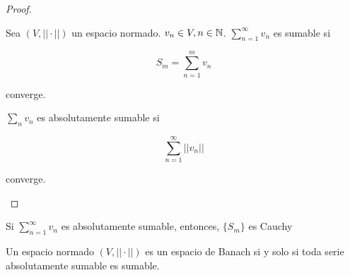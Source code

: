 \documentclass[../Apunte.tex]{subfiles}
\begin{document}
\begin{proof}
    \begin{fdefinition}
        Sea $(V,||\cdot||)$ un espacio normado. $v_n\in V,n\in\mathbb{N}$. $\displaystyle\sum_{n=1}^\infty v_n$ es \color{red} sumable \color{black} si

        \[S_m=\sum_{n=1}^m v_n\]

        converge.

        $\displaystyle\sum_{n} v_n$ es \color{red} absolutamente sumable \color{black} si 

        \[\sum_{n=1}^\infty ||v_n||\]

        converge.
    \end{fdefinition}
\end{proof}

\begin{fproposition}
    Si $\displaystyle\sum_{n=1}^\infty v_n$ es absolutamente sumable, entonces, $\{S_m\}$ es Cauchy
\end{fproposition}

\begin{ftheorem}
    Un espacio normado $(V,||\cdot||)$ es un espacio de Banach si y solo si toda serie absolutamente sumable es sumable.
\end{ftheorem}
\end{document}
